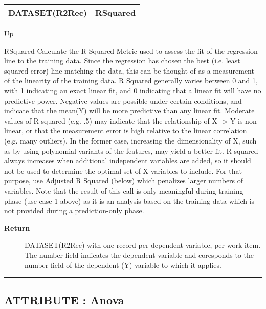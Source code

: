 {\renewcommand{\arraystretch}{1.5}
\begin{tabularx}{\textwidth}{|>{\raggedright\arraybackslash}l|X|}
\hline
\hspace{0pt}DATASET(R2Rec) & RSquared \\
\hline
\end{tabularx}
}

\hyperlink{ecldoc:linearregression.ols}{Up}

\par
RSquared Calculate the R-Squared Metric used to assess the fit of the regression line to the training data. Since the regression has chosen the best (i.e. least squared error) line matching the data, this can be thought of as a measurement of the linearity of the training data. R Squared generally varies between 0 and 1, with 1 indicating an exact linear fit, and 0 indicating that a linear fit will have no predictive power. Negative values are possible under certain conditions, and indicate that the mean(Y) will be more predictive than any linear fit. Moderate values of R squared (e.g. .5) may indicate that the relationship of X -> Y is non-linear, or that the measurement error is high relative to the linear correlation (e.g. many outliers). In the former case, increasing the dimensionality of X, such as by using polynomial variants of the features, may yield a better fit. R squared always increases when additional independent variables are added, so it should not be used to determine the optimal set of X variables to include. For that purpose, use Adjusted R Squared (below) which penalizes larger numbers of variables. Note that the result of this call is only meaningful during training phase (use case 1 above) as it is an analysis based on the training data which is not provided during a prediction-only phase.

\par
\begin{description}
\item [\textbf{Return}] DATASET(R2Rec) with one record per dependent variable, per work-item. The number field indicates the dependent variable and coresponds to the number field of the dependent (Y) variable to which it applies.
\end{description}

\rule{\textwidth}{0.4pt}
\subsection*{ATTRIBUTE : Anova}
\hypertarget{ecldoc:linearregression.ols.anova}{}


